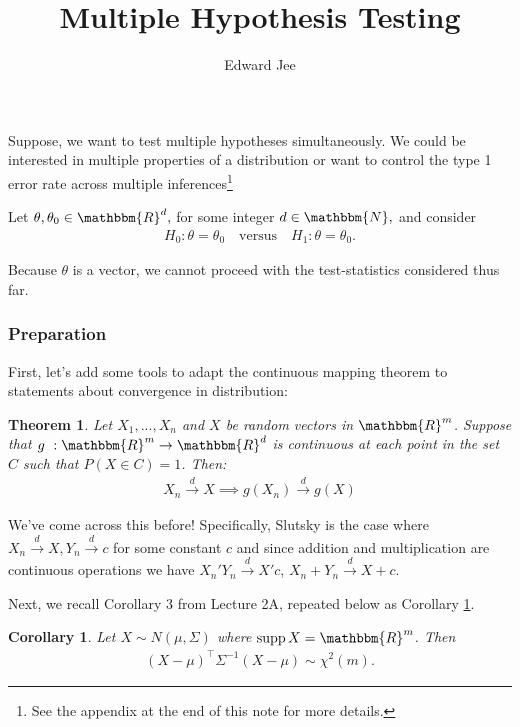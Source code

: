 \documentclass{article}
\author{Edward Jee}
\title{Multiple Hypothesis Testing}
\newtheorem{theorem}{Theorem}
\DeclareMathOperator\supp{supp}
\newtheorem{corollary}{Corollary}[theorem]
\begin{document}
\maketitle


\section*{}
Suppose, we want to test multiple hypotheses simultaneously. We could be 
interested in multiple properties of a distribution or want to control the 
type 1 error rate across multiple inferences\footnote{See the appendix at the 
end of this note for more details.}

    
Let $\theta, \theta_0 \in \mathbbm{R}^d, $ for some integer $d \in \mathbbm{N},$ and consider\begin{align}
        H_0: \theta = \theta_0\quad \text{versus} \quad H_1: \theta = \theta_0.
\end{align}
    
    Because $\theta$ is a vector, we cannot proceed with the test-statistics considered thus far. 
    \subsubsection*{Preparation}
    First, let's add some tools to adapt the continuous mapping theorem to 
    statements about convergence in distribution:
    
    \begin{theorem}\label{cmt-d}
        Let $X_1, ..., X_n$ and $X$ be random vectors in $\mathbbm{R}^m$. Suppose 
        that $g \ : \mathbbm{R}^m \rightarrow \mathbbm{R}^d$ is continuous at 
        each point in the set $C$ such that $P(X \in C) = 1$. Then:
        \begin{align*}
            X_n \xrightarrow{d} X \implies g(X_n) \xrightarrow{d} g(X)
        \end{align*}
    \end{theorem}


    We've come across this before! Specifically, Slutsky is the case where 
    $X_n \xrightarrow{d} X, Y_n \xrightarrow{d} c$ for some constant $c$ and
     since addition and 
    multiplication are continuous operations we have $X_n' Y_n \xrightarrow{d} X'c$, 
    $X_n + Y_n \xrightarrow{d} X + c$. 


    Next, we recall Corollary 3 from Lecture 2A, repeated below as Corollary \ref{chisq}. 
    \begin{corollary}\label{chisq}
    Let $X \sim N(\mu, \Sigma)$ where $\supp X = \mathbbm{R}^m$. Then \begin{align}
        (X - \mu)^\top \Sigma^{-1}(X - \mu) \sim \chi^2(m).
    \end{align}  
    \end{corollary}
\end{document}
